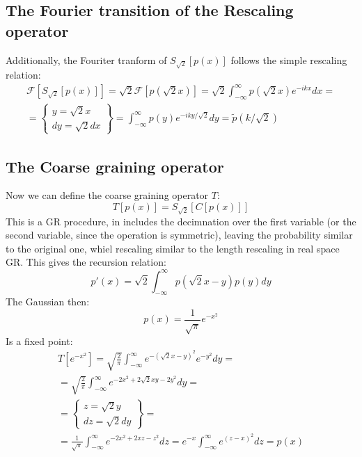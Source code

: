\documentclass{article}
\begin{document}
\subsection{The Fourier transition of the Rescaling operator}
Additionally, the Fouriter tranform of $S_{\sqrt{2}}\left[p(x)\right]$ follows the simple rescaling relation:
\begin{equation}
\begin{gathered}
    \mathcal{F}\left[S_{\sqrt{2}}\left[p(x)\right]\right] = 
    \sqrt{2}\mathcal{F}\left[p(\sqrt{2}x)\right] = 
    \sqrt{2}\int_{-\infty}^\infty p(\sqrt{2}x)e^{-ikx}dx = \\ = \left\{
        \begin{matrix}
            y = \sqrt{2}x \\ dy = \sqrt{2}dx
        \end{matrix}
    \right\} =
    \int_{-\infty}^\infty p(y)e^{-iky/\sqrt{2}}dy = \tilde{p}\left(k/\sqrt{2}\right)
\end{gathered}
\end{equation}
\subsection{The Coarse graining operator}
Now we can define the coarse graining operator $T$:
\begin{equation}
    T[p(x)] = S_{\sqrt{2}}\left[C[p(x)]\right]
\end{equation}
This is a GR procedure, in includes the decimnation over the first variable (or the second variable, since the operation is symmetric), leaving the probability similar to the original one, whiel rescaling similar to the length rescaling in real space GR. This gives the recursion relation:
\begin{equation}
    p'(x) = \sqrt{2}\int_{-\infty}^\infty p(\sqrt{2}x - y)p(y)dy
\end{equation}
The Gaussian then:
\begin{equation}
    p(x) = \frac{1}{\sqrt{\pi}}e^{-x^2}
\end{equation}
Is a fixed point:
\begin{equation}
\begin{gathered}
    T\left[e^{-x^2}\right] = \sqrt{\frac{2}{\pi}}\int_{-\infty}^\infty e^{-(\sqrt{2}x - y)^2}e^{-y^2}dy = \\ =
    \sqrt{\frac{2}{\pi}}\int_{-\infty}^\infty e^{-2x^2 + 2\sqrt{2}xy - 2y^2}dy = \\ = \left\{
    \begin{matrix}
        z = \sqrt{2}y \\ dz = \sqrt{2}dy
    \end{matrix}
    \right\} = \\ =
    \frac{1}{\sqrt{\pi}}\int_{-\infty}^\infty e^{-2x^2 + 2xz - z^2}dz = e^{-x} \int_{-\infty}^\infty e^{(z - x)^2}dz = p(x)
\end{gathered}
\end{equation}
\end{document}
